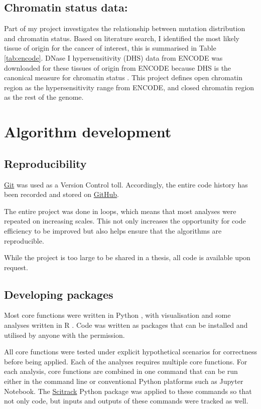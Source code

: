 \subsection{Chromatin status data:} 
Part of my project investigates the relationship between mutation distribution and chromatin status. Based on literature search, I identified the most likely tissue of origin for the cancer of interest, this is summarised in Table \ref{tab:encode}. DNase I hypersensitivity (DHS) data from ENCODE was downloaded for these tissues of origin from ENCODE because DHS is the canonical measure for chromatin status \citep{Thurman2012TheGenome}. This project defines open chromatin region as the hypersensitivity range from ENCODE, and closed chromatin region as the rest of the genome.

\section{Algorithm development}
\subsection{Reproducibility} 
\href{http://git-scm.com}{Git} was used as a Version Control toll. Accordingly, the entire code history has been recorded and stored on \href{https://github.com}{GitHub}.

The entire project was done in loops, which means that most analyses were repeated on increasing scales. This not only increases the opportunity for code efficiency to be improved but also helps ensure that the algorithms are reproducible. 

While the project is too large to be shared in a thesis, all code is available upon request. 

\subsection{Developing packages}
Most core functions were written in Python \citep{van1995python}, with visualisation and some analyses written in R \citep{r}. Code was written as packages that can be installed and utilised by anyone with the permission. 

All core functions were tested under explicit hypothetical scenarios for correctness before being applied. Each of the analyses requires multiple core functions. For each analysis, core functions are combined in one command that can be run either in the command line or conventional Python platforms such as Jupyter Notebook. The \href{https://github.com/HuttleyLab/scitrack}{Scitrack} Python package was applied to these commands so that not only code, but inputs and outputs of these commands were tracked as well.

